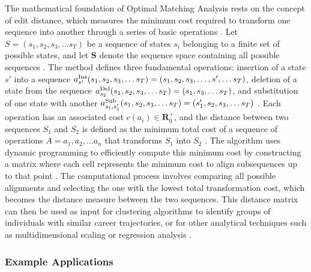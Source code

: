 \documentclass[../main.tex]{subfiles}
\begin{document}
The mathematical foundation of Optimal Matching Analysis rests on the concept of edit distance, which measures the minimum cost required to transform one sequence into another through a series of basic operations \parencite{wikipedia_optimal_matching}. Let \(S=(s_{1},s_{2},s_{3},\ldots s_{T})\) be a sequence of states \(s_{i}\) belonging to a finite set of possible states, and let \(\mathbf{S}\) denote the sequence space containing all possible sequences \parencite{wikipedia_optimal_matching}. The method defines three fundamental operations: insertion of a state \(s'\) into a sequence \(a_{s'}^{\rm {Ins}}(s_{1},s_{2},s_{3},\ldots s_{T})=(s_{1},s_{2},s_{3},\ldots ,s',\ldots s_{T})\), deletion of a state from the sequence \(a_{s_{2}}^{\rm {Del}}(s_{1},s_{2},s_{3},\ldots s_{T})=(s_{1},s_{3},\ldots s_{T})\), and substitution of one state with another \(a_{s_{1},s'_{1}}^{\rm {Sub}}(s_{1},s_{2},s_{3},\ldots s_{T})=(s'_{1},s_{2},s_{3},\ldots s_{T})\) \parencite{wikipedia_optimal_matching}. Each operation has an associated cost \(c(a_{i})\in \mathbf{R}_{0}^{+}\), and the distance between two sequences \(S_{1}\) and \(S_{2}\) is defined as the minimum total cost of a sequence of operations \(A={a_{1},a_{2},\ldots a_{n}}\) that transforms \(S_{1}\) into \(S_{2}\) \parencite{wikipedia_optimal_matching}. The algorithm uses dynamic programming to efficiently compute this minimum cost by constructing a matrix where each cell represents the minimum cost to align subsequences up to that point \parencite{abbott_forrest_1986}. The computational process involves comparing all possible alignments and selecting the one with the lowest total transformation cost, which becomes the distance measure between the two sequences. This distance matrix can then be used as input for clustering algorithms to identify groups of individuals with similar career trajectories, or for other analytical techniques such as multidimensional scaling or regression analysis \parencite{sequence_analysis_wikipedia}.

\subsubsection{Example Applications}
\end{document}
